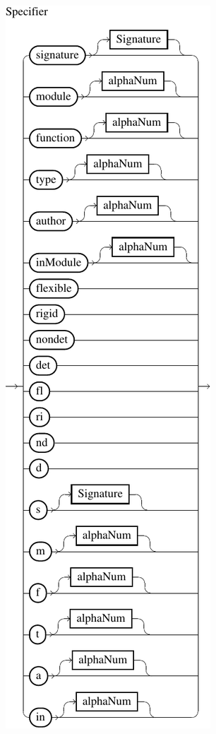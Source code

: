 \documentclass[%
	latex,%
	a4paper,%
	oneside,%
	chapterprefix,%
	headsepline,%
	12pt%
]{scrbook}
\begin{document}
\begin{center}
\includegraphics{bilder/Specifier}
\end{center}



% 
\end{document}
